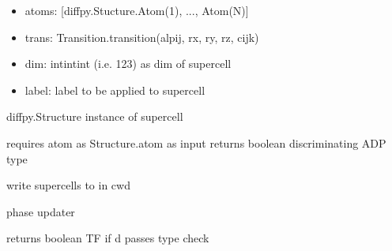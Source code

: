 \documentclass[letterpaper,10pt,english]{sphinxmanual}
\begin{document}
\begin{fulllineitems}
\begin{fulllineitems}
\begin{itemize}
\item {} 
atoms: {[}diffpy.Stucture.Atom(1), ..., Atom(N){]}

\item {} 
trans: Transition.transition(alpij, rx, ry, rz, cijk)

\item {} 
dim: intintint (i.e. 123) as dim of supercell

\item {} 
label: label to be applied to supercell

\end{itemize}

 diffpy.Structure instance of supercell

\end{fulllineitems}


\begin{fulllineitems}
\label{\detokenize{rst/interface:mstack.interface.Interface.is_Uiso}}
requires atom as Structure.atom as input
returns boolean discriminating ADP type

\end{fulllineitems}


\begin{fulllineitems}
\label{\detokenize{rst/interface:mstack.interface.Interface.to_cif}}
write supercells to  in cwd

\end{fulllineitems}


\begin{fulllineitems}
\label{\detokenize{rst/interface:mstack.interface.Interface.update_phases}}
phase updater

\end{fulllineitems}


\end{fulllineitems}


\begin{fulllineitems}
\label{\detokenize{rst/interface:mstack.interface.is_dict}}
returns boolean T\textbar{}F if d passes type check

\end{fulllineitems}
\end{document}
